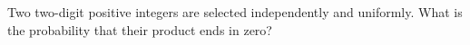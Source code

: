 Two two-digit positive integers are selected independently and uniformly. What is the probability that their product ends in zero?
